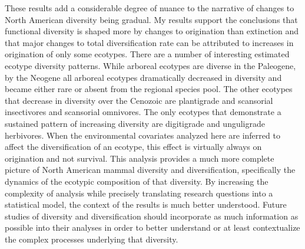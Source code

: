 \documentclass[12pt,letterpaper]{article}
\begin{document}
These results add a considerable degree of nuance to the narrative of changes to North American diversity being gradual. My results support the conclusions that functional diversity is shaped more by changes to origination than extinction and that major changes to total diversification rate can be attributed to increases in origination of only some ecotypes. There are a number of interesting estimated ecotype diversity patterns. While arboreal ecotypes are diverse in the Paleogene, by the Neogene all arboreal ecotypes dramatically decreased in diversity and became either rare or absent from the regional species pool. The other ecotypes that decrease in diversity over the Cenozoic are plantigrade and scansorial insectivores and scansorial omnivores. The only ecotypes that demonstrate a sustained pattern of increasing diversity are digitigrade and unguligrade herbivores. When the environmental covariates analyzed here are inferred to affect the diversification of an ecotype, this effect is virtually always on origination and not survival. This analysis provides a much more complete picture of North American mammal diversity and diversification, specifically the dynamics of the ecotypic composition of that diversity. By increasing the complexity of analysis while precisely translating research questions into a statistical model, the context of the results is much better understood. Future studies of diversity and diversification should incorporate as much information as possible into their analyses in order to better understand or at least contextualize the complex processes underlying that diversity.
\end{document}
